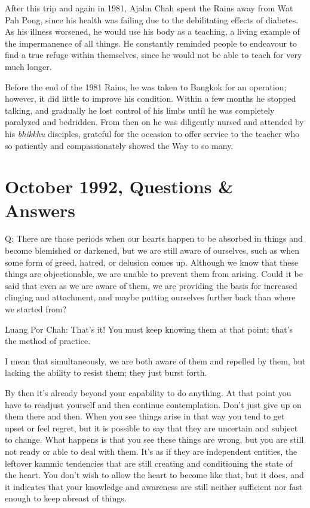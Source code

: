After this trip and again in 1981, Ajahn Chah spent the Rains away from
Wat Pah Pong, since his health was failing due to the debilitating
effects of diabetes. As his illness worsened, he would use his body as a
teaching, a living example of the impermanence of all things. He
constantly reminded people to endeavour to find a true refuge within
themselves, since he would not be able to teach for very much longer.

Before the end of the 1981 Rains, he was taken to Bangkok for an
operation; however, it did little to improve his condition. Within a few
months he stopped talking, and gradually he lost control of his limbs
until he was completely paralyzed and bedridden. From then on he was
diligently nursed and attended by his \emph{bhikkhu} disciples, grateful
for the occasion to offer service to the teacher who so patiently and
compassionately showed the Way to so many.

\chapter{October 1992, Questions \& Answers}

Q: There are those periods when our hearts happen to be absorbed in
things and become blemished or darkened, but we are still aware of
ourselves, such as when some form of greed, hatred, or delusion comes
up. Although we know that these things are objectionable, we are unable
to prevent them from arising. Could it be said that even as we are aware
of them, we are providing the basis for increased clinging and
attachment, and maybe putting ourselves further back than where we
started from?

Luang Por Chah: That's it! You must keep knowing them at that point;
that's the method of practice.

I mean that simultaneously, we are both aware of them and repelled by
them, but lacking the ability to resist them; they just burst forth.

By then it's already beyond your capability to do anything. At that
point you have to readjust yourself and then continue contemplation.
Don't just give up on them there and then. When you see things arise in
that way you tend to get upset or feel regret, but it is possible to say
that they are uncertain and subject to change. What happens is that you
see these things are wrong, but you are still not ready or able to deal
with them. It's as if they are independent entities, the leftover kammic
tendencies that are still creating and conditioning the state of the
heart. You don't wish to allow the heart to become like that, but it
does, and it indicates that your knowledge and awareness are still
neither sufficient nor fast enough to keep abreast of things.

